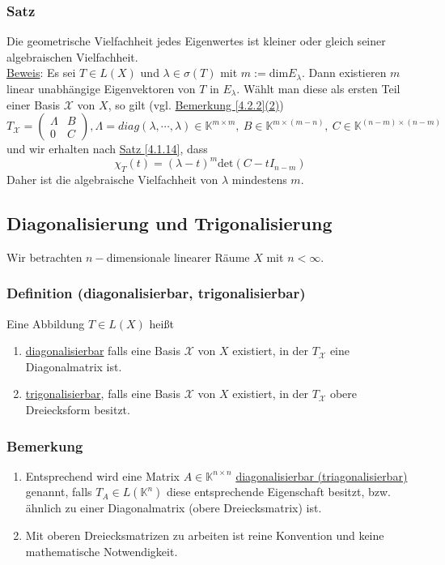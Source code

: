 \subsubsection{Satz}
\label{4.3.7}
Die geometrische Vielfachheit jedes Eigenwertes ist kleiner oder gleich seiner algebraischen Vielfachheit.\\
\underline{Beweis}: Es sei $T\in L(X)$ und $\lambda \in \sigma (T)$ mit $m:=$dim$E_\lambda$.  Dann existieren $m$ linear unabhängige Eigenvektoren von $T$ in $E_\lambda$.  Wählt man diese als ersten Teil einer Basis $\mathcal{X}$ von $X$, so gilt (vgl. \hyperref[4.2.2]{Bemerkung \ref{4.2.2}(2)})
\[T_\mathcal{X} =\begin{pmatrix}\Lambda & B\\ 0 & C\end{pmatrix}, \Lambda=diag(\lambda ,\cdots ,\lambda )\in\mathbb{K}^{m\times m},\ B\in\mathbb{K}^{m\times (m-n)},\ C\in\mathbb{K}^{(n-m)\times (n-m)}\]
und wir erhalten nach \hyperref[4.1.14]{Satz \ref{4.1.14}}, dass
\[\chi _T(t)=(\lambda -t)^m \mathrm{det}(C-tI_{n-m})\]
Daher ist die algebraische Vielfachheit von $\lambda$ mindestens $m$.
\subsection{Diagonalisierung und Trigonalisierung}
Wir betrachten $n-$dimensionale linearer Räume $X$ mit $n<\infty$.
\subsubsection{Definition (diagonalisierbar, trigonalisierbar)}
Eine Abbildung $T\in L(X)$ heißt
\renewcommand{\labelenumi}{(\alph{enumi})}
\begin{enumerate}
\item \underline{diagonalisierbar} falls eine Basis $\mathcal{X}$ von $X$ existiert, in der $T_\mathcal{X}$ eine Diagonalmatrix ist.
\item \underline{trigonalisierbar}, falls eine Basis $\mathcal{X}$ von $X$ existiert, in der $T_\mathcal{X}$ obere Dreiecksform besitzt.
\end{enumerate}
\subsubsection{Bemerkung}
\renewcommand{\labelenumi}{(\arabic{enumi})}
\begin{enumerate}
\item Entsprechend wird eine Matrix $A\in \mathbb{K}^{n\times n}$ \underline{diagonalisierbar (triagonalisierbar)} genannt, falls $T_A\in L(\mathbb{K}^n)$ diese entsprechende Eigenschaft besitzt, bzw. ähnlich zu einer Diagonalmatrix (obere Dreiecksmatrix) ist.
\item Mit oberen Dreiecksmatrizen zu arbeiten ist reine Konvention und keine mathematische Notwendigkeit.
\end{enumerate}
